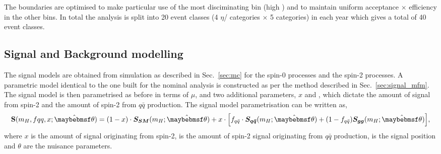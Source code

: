 The \abscostheta boundaries are optimised to make particular use of the most disciminating 
bin (high \abscostheta) and to maintain uniform acceptance $\times$ efficiency in the 
other bins. In total the analysis is split into 20 event classes (4 $\eta$/\rnine\xspace 
categories $\times$ 5 \abscostheta categories) in each year which gives a total of 40 event classes.

\subsection{Signal and Background modelling}

The signal models are obtained from \MC simulation as described in Sec.~\ref{sec:mc} for the spin-0 \SM processes and the spin-2 processes. A parametric model identical to the one built for the nominal analysis is constructed as per the method described in Sec.~\ref{sec:signal_mfm}. The signal model is then parametrised as before in terms of $\mu$, \mH and two additional parameters, $x$ and \fqqbar, which dictate the amount of signal from spin-2 and the amount of spin-2 from $q\bar{q}$ production. The signal model parametrisation can be written as,
\begin{equation}
  \textbf{S}(m_{H},fqq,x;\hat{\theta}) = (1-x)\cdot\boldsymbol{S_{SM}}(m_{H};\hat{\theta})  + x\cdot\Bigl[f_{q\bar{q}}\cdot \boldsymbol{S_{q\bar{q}}}(m_{H};\hat{\theta}) + (1-f_{q\bar{q}})\boldsymbol{S_{gg}}(m_{H};\hat{\theta})\Bigr],  
  \label{eq:spin_sig}
\end{equation}
where $x$ is the amount of signal originating from spin-2, \fqqbar is the amount of spin-2 signal originating from $q\bar{q}$ production, \mH is the signal position and $\theta$ are the nuisance parameters.

